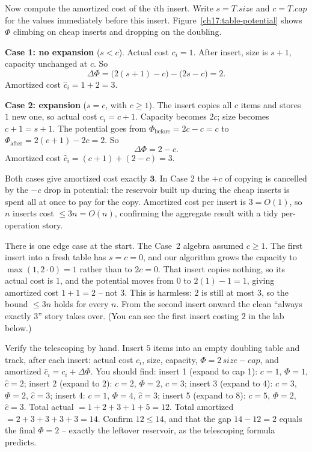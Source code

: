 Now compute the amortized cost of the $i$th insert. Write $s = T.\mathit{size}$ and
$c = T.\mathit{cap}$ for the values immediately before this insert.
Figure~\ref{ch17:table-potential} shows $\Phi$ climbing on
cheap inserts and dropping on the doubling.

\textbf{Case 1: no expansion} ($s < c$). Actual cost $c_i = 1$. After insert,
size is $s+1$, capacity unchanged at $c$. So
\[
  \Delta\Phi = \bigl(2(s+1) - c\bigr) - \bigl(2s - c\bigr) = 2.
\]
Amortized cost $\hat{c}_i = 1 + 2 = 3$.

\textbf{Case 2: expansion} ($s = c$, with $c \ge 1$). The insert copies all $c$
items and stores $1$ new one, so actual cost $c_i = c + 1$. Capacity becomes $2c$;
size becomes $c + 1 = s + 1$. The potential goes from
$\Phi_{\text{before}} = 2c - c = c$ to $\Phi_{\text{after}} = 2(c+1) - 2c = 2$. So
\[
  \Delta\Phi = 2 - c.
\]
Amortized cost $\hat{c}_i = (c + 1) + (2 - c) = 3$.

\begin{focusbox}
Both cases give amortized cost exactly $\mathbf{3}$. In Case 2 the $+c$ of
copying is cancelled by the $-c$ drop in potential: the reservoir built up during
the cheap inserts is spent all at once to pay for the copy. Amortized cost per insert is $3 = O(1)$, so $n$
inserts cost $\le 3n = O(n)$, confirming the aggregate result with a tidy
per-operation story.
\end{focusbox}

\begin{remark}
There is one edge case at the start. The Case~2 algebra assumed $c \ge 1$.
The first insert into a fresh table has $s = c = 0$, and our algorithm grows the
capacity to $\max(1, 2 \cdot 0) = 1$ rather than to $2c = 0$. That insert copies
nothing, so its actual cost is $1$, and the potential moves from $0$ to
$2(1) - 1 = 1$, giving amortized cost $1 + 1 = 2$ -- not $3$. This is harmless: $2$
is still at most $3$, so the bound $\le 3n$ holds for every $n$. From the second
insert onward the clean ``always exactly $3$'' story takes over. (You can see the
first insert costing $2$ in the lab below.)
\end{remark}

\begin{labbox}
Verify the telescoping by hand. Insert $5$ items into an empty doubling table and
track, after each insert: actual cost $c_i$, size, capacity, $\Phi = 2\,\mathit{size}
- \mathit{cap}$, and amortized $\hat{c}_i = c_i + \Delta\Phi$.
You should find: insert 1 (expand to cap 1): $c=1$, $\Phi=1$, $\hat{c}=2$; insert 2
(expand to 2): $c=2$, $\Phi=2$, $\hat c=3$; insert 3 (expand to 4): $c=3$,
$\Phi=2$, $\hat c=3$; insert 4: $c=1$, $\Phi=4$, $\hat c=3$; insert 5 (expand to 8):
$c=5$, $\Phi=2$, $\hat c=3$. Total actual $= 1+2+3+1+5 = 12$. Total amortized
$= 2+3+3+3+3 = 14$. Confirm $12 \le 14$, and that the gap $14 - 12 = 2$ equals the
final $\Phi = 2$ -- exactly the leftover reservoir, as the telescoping formula
predicts.
\end{labbox}

